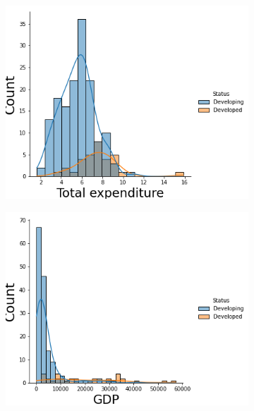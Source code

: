 \begin{itemize}
               \begin{figure}[H]
              \centering
              \begin{subfigure}{0.3\linewidth}
                \centering
                \includegraphics[width=\textwidth]{img/16.png}
              \end{subfigure}
              \hfill
                \begin{subfigure}{0.3\linewidth}
                \centering
                \includegraphics[width=\textwidth]{img/17.png}
              \end{subfigure}
                \hfill

\end{figure}
\end{itemize}

